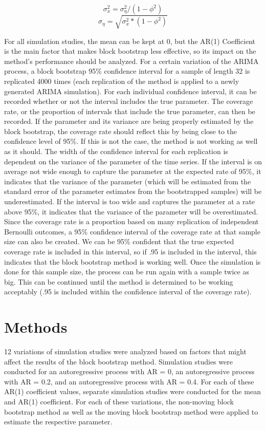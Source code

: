 \documentclass[12pt, letterpaper, titlepage]{article}
\begin{document}
\[ \sigma_{x}^{2}=\sigma_{\eta}^{2}/\left( 1-\phi^2 \right)\]
\[\sigma_{\eta}=\sqrt{\sigma_{x}^{2}*\left( 1-\phi^2 \right)}\]

For all simulation studies, the mean can be kept at 0, but the AR(1) Coefficient is the main factor that makes block bootstrap less effective, so its impact on the method's performance should be analyzed. For a certain variation of the ARIMA process, a block bootstrap 95\% confidence interval for a sample of length 32 is replicated 4000 times (each replication of the method is applied to a newly generated ARIMA simulation). For each individual confidence interval, it can be recorded whether or not the interval includes the true parameter. The coverage rate, or the proportion of intervals that include the true parameter, can then be recorded. If the parameter and its variance are being properly estimated by the block bootstrap, the coverage rate should reflect this by being close to the confidence level of 95\%. If this is not the case, the method is not working as well as it should. The width of the confidence interval for each replication is dependent on the variance of the parameter of the time series. If the interval is on average not wide enough to capture the parameter at the expected rate of 95\%, it indicates that the variance of the parameter (which will be estimated from the standard error of the parameter estimates from the bootstrapped samples) will be underestimated. If the interval is too wide and captures the parameter at a rate above 95\%, it indicates that the variance of the parameter will be overestimated. Since the coverage rate is a proportion based on many replication of independent Bernoulli outcomes, a 95\% confidence interval of the coverage rate at that sample size can also be created. We can be 95\% confident that the true expected coverage rate is included in this interval, so if .95 is included in the interval, this indicates that the block bootstrap method is working well. Once the simulation is done for this sample size, the process can be run again with a sample twice as big. This can be continued until the method is determined to be working acceptably (.95 is included within the confidence interval of the coverage rate).

\section{Methods}
\label{sec:methods}

12 variations of simulation studies were analyzed based on factors that might affect the results of the block bootstrap method. Simulation studies were conducted for an autoregressive process with AR = 0, an autoregressive process with AR = 0.2, and an autoregressive process with AR = 0.4. For each of these AR(1) coefficient values, separate simulation studies were conducted for the mean and AR(1) coefficient. For each of these variations, the non-moving block bootstrap method as well as the moving block bootstrap method were applied to estimate the respective parameter. 
\end{document}
